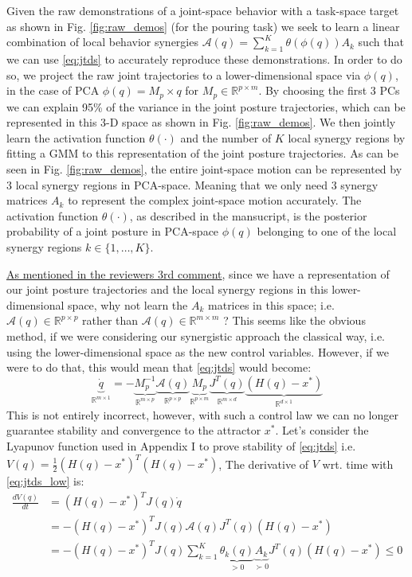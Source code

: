 \documentclass{article}
\begin{document}
Given the raw demonstrations of a joint-space  behavior with a task-space target as shown in Fig. \ref{fig:raw_demos} (for the pouring task) we seek to learn a linear combination of local behavior synergies $\mathcal{A}(q) = \sum\limits_{k=1}^{K}\theta(\phi(q))A_k$ such that we can use \eqref{eq:jtds} to accurately reproduce these demonstrations. In order to do so, we project the raw joint trajectories to a lower-dimensional space via $\phi(q)$, in the case of PCA $\phi(q)=M_p \times q$ for $M_p \in \mathbb{R}^{p \times m}$. By choosing the first 3 PCs we can explain 95\% of the variance in the joint posture trajectories, which can be represented in this 3-D space as shown in Fig. \ref{fig:raw_demos}. We then jointly learn the activation function $\theta(\cdot)$ and the number of $K$ local synergy regions by fitting a GMM to this representation of the joint posture trajectories. As can be seen in Fig. \ref{fig:raw_demos}, the entire joint-space motion can be represented by 3 local synergy regions in PCA-space. Meaning that we only need 3 synergy matrices $A_k$ to represent the complex joint-space motion accurately. The activation function $\theta(\cdot)$, as described in the mansucript, is the posterior probability of a joint posture in PCA-space $\phi(q)$ belonging to one of the local synergy regions $k \in \{1,\dots,K\}$.

\underline{As mentioned in the reviewers 3rd comment}, since we have a representation of our joint posture trajectories and the local synergy regions in this lower-dimensional space, why not learn the $A_k$ matrices in this space; i.e. $\mathcal{A}(q)\in \mathbb{R}^{p\times p}$ rather than $\mathcal{A}(q)\in \mathbb{R}^{m\times m}$ ? This seems like the obvious method, if we were considering our synergistic approach the classical way, i.e. using the lower-dimensional space as the new control variables. However, if we were to do that, this would mean that \eqref{eq:jtds} would become:
\begin{equation}
\underbrace{\dot{q}}_{\mathbb{R}^{m\times 1}} = -\underbrace{M_p^{-1}}_{\mathbb{R}^{m\times p}}\underbrace{\mathcal{A}(q)}_{\mathbb{R}^{p\times p}}\underbrace{M_p}_{\mathbb{R}^{p\times m}}\underbrace{J^{T}(q)}_{\mathbb{R}^{m\times d}}\underbrace{(H(q)-x^*)}_{\mathbb{R}^{d\times 1}}
\label{eq:jtds_low}
\end{equation}
This is not entirely incorrect, however, with such a control law we can no longer guarantee stability and convergence to the attractor $x^{*}$. Let's consider the Lyapunov function used in Appendix I to prove stability of \eqref{eq:jtds} i.e. $V(q) = \frac{1}{2}(H(q) - x^*)^T(H(q) - x^*)$, The derivative of $ V $ wrt. time with \eqref{eq:jtds_low} is:
\begin{equation}
\begin{aligned}
\frac{dV(q)}{dt} &= (H(q) - x^*)^TJ(q)\dot{q}\\
&= -(H(q) - x^*)^TJ(q)\mathcal{A}(q)J^T(q)(H(q) - x^*)\\
&= -(H(q) - x^*)^TJ(q)\sum_{k=1}^{K}\underbrace{\theta_k(q)}_{> 0}\underbrace{A_k}_{\succ 0}J^T(q)(H(q) - x^*)\leq 0
\end{aligned}
\end{equation}
\end{document}
